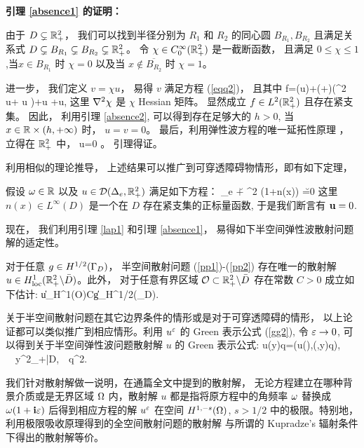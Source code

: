 \finproof



{\noindent \bf 引理 \ref{absence1} 的证明：} 

由于 $D\subsetneq\mathbb{R}^2_+$， 我们可以找到半径分别为 $R_1$ 和 $R_2$ 的同心圆 $B_{R_1},B_{R_2}$ 且满足关系式 $D\subsetneq B_{R_1}\subsetneq B_{R_2}  \subsetneq \mathbb{R}^2_+$。 令 $\chi \in C_{0}^{\infty}(\mathbb{R}^2_+)$ 是一截断函数， 且满足 $0 \leq \chi \leq 1$,当$x\in B_{R_1}$ 时 $\chi=0$  以及当 $x\notin \overline{B_{R_2}}$ 时 $\chi=1$。

进一步， 我们定义 $v=\chi u$，
易得 $v$ 满足方程 (\ref{eqq2})， 且其中
\ben
f=\sigma(u)\na\chi+(\lambda+\mu)(\na^2 \chi u+ \na u \na\chi)+\mu\Delta\chi u +\mu\div u\na\chi,
\een
 这里 $\nabla^2 \chi$ 是 $\chi$ Hessian 矩阵。 显然成立 $f\in L^2(\mathbb{R}^2_+)$ 且存在紧支集。 因此， 利用引理 \ref{absence2}, 可以得到存在足够大的 $h>0$, 当 $x\in \mathbb{R}\times(h,+\infty)$ 时， $u=v=0$。 最后，利用弹性波方程的唯一延拓性原理 \cite{Morassi2001STRONG}，
立得在 $\mathbb{R}^2_+$ 中， u=0 。 引理得证。
\finproof

利用相似的理论推导， 上述结果可以推广到可穿透障碍物情形，即有如下定理，
\begin{lem}
	假设 $\omega\in \mathbb{R}$ 以及 $u\in \mathcal{D}(\Delta_e,\mathbb{R}^2_+)$ 满足如下方程： 
	\ben
	\De_e \u + \om^2 (1+n(x)) \u =0
	\een
	这里 $n(x)\in L^{\infty}(D)$ 是一个在 $D$ 存在紧支集的正标量函数,
	于是我们断言有 $\mathbf{u}=0$.
\end{lem}


现在， 我们利用引理 \ref{lap1} 和引理 \ref{absence1}， 易得如下半空间弹性波散射问题解的适定性。
\begin{thm} \label{thm:4.1}\label{lap2}
	对于任意 $g \in H^{1/2}(\Gamma_D)$， 半空间散射问题 (\ref{pp1})-(\ref{pp2})
	存在唯一的散射解 $u\in H^{1}_{\rm loc}(\mathbb{R}^2_+ \backslash \bar D)$。此外， 对于任意有界区域 $\mathcal O\subset \mathbb{R}^2_+\backslash\bar D$ 存在常数 $C>0$ 成立如下估计:
	\ben
	\|u\|_{H^{1}(\mathcal O)}\le C\|g\|_{H^{1/2}(\Ga_D)}.
	\een
\end{thm}

关于半空间散射问题在其它边界条件的情形或是对于可穿透障碍的情形， 以上论证都可以类似推广到相应情形。利用 $u^\varepsilon$ 的 Green 表示公式 (\ref{gg2}), 令 $\varepsilon\to 0$, 可以得到关于半空间弹性波问题散射解 $u$ 的 Green 表示公式: 
\be\label{g2}
u(y)\cdot q=\GG(u(\cdot),\N(\cdot,y)q), \ \ \forall y\in\R^2_+\bks\bar D,\ \ \forall q\in\R^2.
\ee
\begin{remark}
	我们针对散射解做一说明，在通篇全文中提到的散射解， 无论方程建立在哪种背景介质或是无界区域 $\Omega
	$ 内，散射解 $u$ 都是指将原方程中的角频率 $\omega$ 替换成 $\omega(1+\mathbf{i}\varepsilon)$ 后得到相应方程的解 $u^\varepsilon$ 在空间 $H^{1,-s}(\Omega)$, $s>1/2$ 中的极限。特别地， 利用极限吸收原理得到的全空间散射问题的散射解 \cite{leis, cxz2016} 与所谓的 Kupradze's 辐射条件下得出的散射解等价。
\end{remark}

